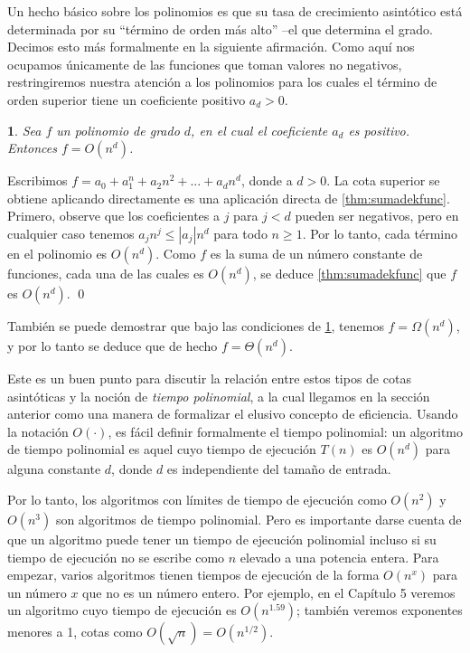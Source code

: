 \documentclass[a4paper, 12pt]{book}
\theoremstyle{dotless}
\newtheorem{theorem}{}%
\renewenvironment{proof}{{\noindent\bfseries Demostración.}}{\qed\vspace{12pt}}
\begin{document}
Un hecho básico sobre los polinomios es que su tasa de crecimiento asintótico está determinada por su ``término de orden más alto'' --el que determina el grado. Decimos esto más formalmente en la siguiente afirmación. Como aquí nos ocupamos únicamente de las funciones que toman valores no negativos, restringiremos nuestra atención a los polinomios para los cuales el término de orden superior tiene un coeficiente positivo $a_d>0$.

\begin{theorem}
\label{thm:ordendepoli}
Sea $f$ un polinomio de grado $d$, en el cual el coeficiente $a_d$ es positivo. Entonces $f = O(n^d)$.
\end{theorem}

\begin{proof}
Escribimos $f = a_0 + a_1^n + a_2n^2 + ... + a_dn^d$, donde a $d>0$. La cota superior se obtiene aplicando directamente es una aplicación directa de \ref{thm:sumadekfunc}. Primero, observe que los coeficientes a $j$ para $j<d$ pueden ser negativos, pero en cualquier caso tenemos $a_jn^j ≤ |a_j|n^d$ para todo $n≥1$. Por lo tanto, cada término en el polinomio es $O(n^d)$. Como $f$ es la suma de un número constante de funciones, cada una de las cuales es $O(n^d)$, se deduce \ref{thm:sumadekfunc} que $f$ es $O(n^d)$. 
\end{proof}

También se puede demostrar que bajo las condiciones de \ref{thm:ordendepoli}, tenemos $f=\Omega(n^d)$, y por lo tanto se deduce que de hecho $f = \Theta(n^d)$.

Este es un buen punto para discutir la relación entre estos tipos de cotas asintóticas y la noción de \textit{tiempo polinomial}, a la cual llegamos en la sección anterior como una manera de formalizar el elusivo concepto de eficiencia. Usando la notación $O(\cdot)$, es fácil definir formalmente el tiempo polinomial: un algoritmo de tiempo polinomial es aquel cuyo tiempo de ejecución $T(n)$ es $O(n^d)$ para alguna constante $d$, donde $d$ es independiente del tamaño de entrada.

Por lo tanto, los algoritmos con límites de tiempo de ejecución como $O(n^2)$ y $O(n^3)$ son algoritmos de tiempo polinomial. Pero es importante darse cuenta de que un algoritmo puede tener un tiempo de ejecución polinomial incluso si su tiempo de ejecución no se escribe como $n$ elevado a una potencia entera. Para empezar, varios algoritmos tienen tiempos de ejecución de la forma $O(n^x)$ para un número $x$ que no es un número entero. Por ejemplo, en el Capítulo 5 veremos un algoritmo cuyo tiempo de ejecución es $O(n^{1.59})$; también veremos exponentes menores a 1, cotas como $O(\sqrt{n}) = O(n^{1/2})$.
\end{document}
